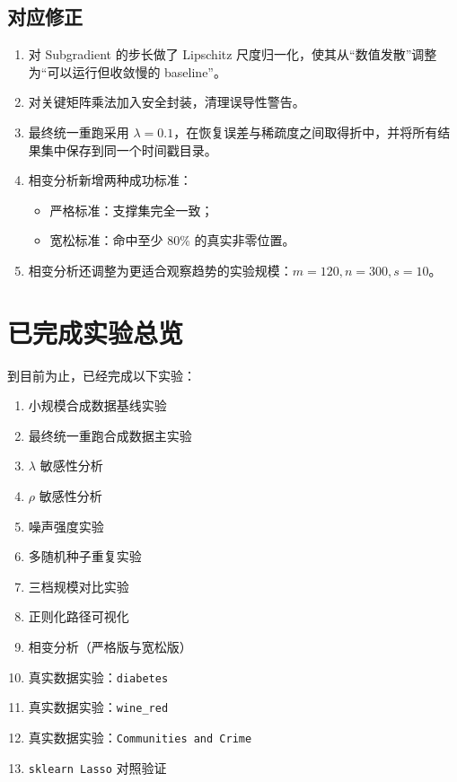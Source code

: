 \documentclass[12pt,a4paper]{ctexart}
\begin{document}
\subsection{对应修正}
\begin{enumerate}[label=\arabic*.]
    \item 对 Subgradient 的步长做了 Lipschitz 尺度归一化，使其从“数值发散”调整为“可以运行但收敛慢的 baseline”。
    \item 对关键矩阵乘法加入安全封装，清理误导性警告。
    \item 最终统一重跑采用 $\lambda=0.1$，在恢复误差与稀疏度之间取得折中，并将所有结果集中保存到同一个时间戳目录。
    \item 相变分析新增两种成功标准：
    \begin{itemize}[leftmargin=2em]
        \item 严格标准：支撑集完全一致；
        \item 宽松标准：命中至少 80\% 的真实非零位置。
    \end{itemize}
    \item 相变分析还调整为更适合观察趋势的实验规模：$m=120, n=300, s=10$。
\end{enumerate}

\section{已完成实验总览}
到目前为止，已经完成以下实验：
\begin{enumerate}[label=\arabic*.]
    \item 小规模合成数据基线实验
    \item 最终统一重跑合成数据主实验
    \item $\lambda$ 敏感性分析
    \item $\rho$ 敏感性分析
    \item 噪声强度实验
    \item 多随机种子重复实验
    \item 三档规模对比实验
    \item 正则化路径可视化
    \item 相变分析（严格版与宽松版）
    \item 真实数据实验：\texttt{diabetes}
    \item 真实数据实验：\texttt{wine\_red}
    \item 真实数据实验：\texttt{Communities and Crime}
    \item \texttt{sklearn Lasso} 对照验证
\end{enumerate}
\end{document}
